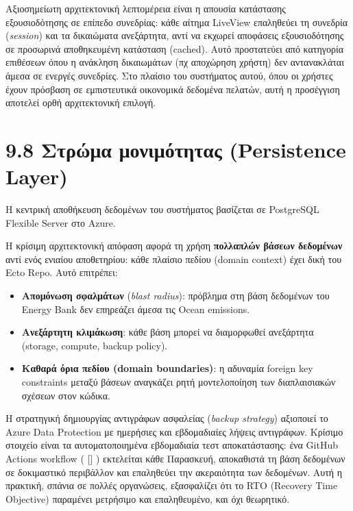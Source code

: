 \documentclass[11pt,a4paper,greek,twoside]{template-xe}
\let\origtexttt\texttt
\renewcommand{\texttt}[1]{%
  \begingroup
  \StrSubstitute{#1}{.}{.\allowbreak}[\tttmp]%
  \origtexttt{\tttmp}%
  \endgroup
}
\providecommand{\tightlist}{\setlength{\itemsep}{0pt}\setlength{\parskip}{0pt}}
\begin{document}
Αξιοσημείωτη αρχιτεκτονική λεπτομέρεια είναι η απουσία κατάστασης
εξουσιοδότησης σε επίπεδο συνεδρίας: κάθε αίτημα LiveView επαληθεύει τη
συνεδρία (\emph{session}) και τα δικαιώματα ανεξάρτητα, αντί να εκχωρεί
αποφάσεις εξουσιοδότησης σε προσωρινά αποθηκευμένη κατάσταση (cached).
Αυτό προστατεύει από κατηγορία επιθέσεων όπου η ανάκληση δικαιωμάτων (πχ
αποχώρηση χρήστη) δεν αντανακλάται άμεσα σε ενεργές συνεδρίες. Στο
πλαίσιο του συστήματος αυτού, όπου οι χρήστες έχουν πρόσβαση σε
εμπιστευτικά οικονομικά δεδομένα πελατών, αυτή η προσέγγιση αποτελεί
ορθή αρχιτεκτονική επιλογή.

\section{9.8 Στρώμα μονιμότητας (Persistence
Layer)}\label{ux3c3ux3c4ux3c1ux3ceux3bcux3b1-ux3bcux3bfux3bdux3b9ux3bcux3ccux3c4ux3b7ux3c4ux3b1ux3c2-persistence-layer}

Η κεντρική αποθήκευση δεδομένων του συστήματος βασίζεται σε PostgreSQL
Flexible Server στο Azure.

Η κρίσιμη αρχιτεκτονική απόφαση αφορά τη χρήση \textbf{πολλαπλών βάσεων
δεδομένων} αντί ενός ενιαίου αποθετηρίου: κάθε πλαίσιο πεδίου (domain
context) έχει δική του Ecto Repo. Αυτό επιτρέπει:

\begin{itemize}
\tightlist
\item
  \textbf{Απομόνωση σφαλμάτων} (\emph{blast radius}): πρόβλημα στη βάση
  δεδομένων του Energy Bank δεν επηρεάζει άμεσα τις Ocean emissions.
\item
  \textbf{Ανεξάρτητη κλιμάκωση}: κάθε βάση μπορεί να διαμορφωθεί
  ανεξάρτητα (storage, compute, backup policy).
\item
  \textbf{Καθαρά όρια πεδίου (domain boundaries)}: η αδυναμία foreign
  key constraints μεταξύ βάσεων αναγκάζει ρητή μοντελοποίηση των
  διαπλαισιακών σχέσεων στον κώδικα.
\end{itemize}

Η στρατηγική δημιουργίας αντιγράφων ασφαλείας (\emph{backup strategy})
αξιοποιεί το Azure Data Protection με ημερήσιες και εβδομαδιαίες λήψεις
αντιγράφων. Κρίσιμο στοιχείο είναι τα αυτοματοποιημένα εβδομαδιαία τεστ
αποκατάστασης: ένα GitHub Actions workflow
(\texttt{db-restore-from-backup.yml}) εκτελείται κάθε Παρασκευή,
αποκαθιστά τη βάση δεδομένων σε δοκιμαστικό περιβάλλον και επαληθεύει
την ακεραιότητα των δεδομένων. Αυτή η πρακτική, σπάνια σε πολλές
οργανώσεις, εξασφαλίζει ότι το RTO (Recovery Time Objective) παραμένει
μετρήσιμο και επαληθευμένο, και όχι θεωρητικό.
\end{document}
